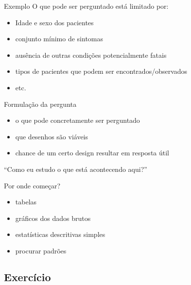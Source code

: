 \documentclass{beamer}
\begin{document}
\begin{frame}{Exemplo}
  \scriptsize
  O que \alert{pode} ser perguntado está limitado por:
  \bigskip
  \begin{itemize}
    \footnotesize
  \item Idade e sexo dos pacientes
    \bigskip
  \item conjunto mínimo de sintomas
    \bigskip
  \item ausência de outras condições potencialmente fatais
    \bigskip
  \item tipos de pacientes que podem ser encontrados/observados
  \item etc.
  \end{itemize}
\end{frame}

\begin{frame}{Formulação da pergunta}
  \begin{itemize}
    \footnotesize
  \item o que pode concretamente ser perguntado
    \bigskip
  \item que desenhos são viáveis
    \bigskip
  \item chance de um certo design resultar em resposta útil
  \end{itemize}
  \bigskip
  \pause
  \begin{block}{}
    { ``Como eu estudo o que está acontecendo aqui?''}
  \end{block}
\end{frame}

\begin{frame}{Por onde começar?}
  \begin{itemize}
    \footnotesize
  \item tabelas
    \bigskip
  \item gráficos dos dados brutos
    \bigskip
  \item estatísticas descritivas simples
    \bigskip
  \item procurar padrões
  \end{itemize}
\end{frame}

\subsection{Exercício}
\end{document}
